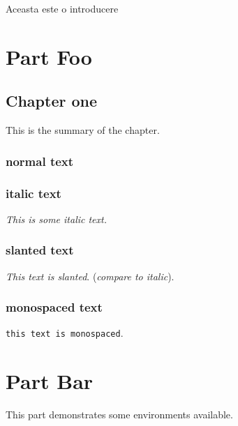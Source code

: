 \documentclass[a4paper,11pt,oneside]{yapbook}
\begin{document}
\frontmatter

\begin{abstract}

\lipsum

\end{abstract}

\tableofcontents


Aceasta este o introducere

\mainmatter

\part{Part Foo}

\chapter{Chapter one}

\begin{chapsummary}
This is the summary
of the chapter.

\lipsum[1]

\end{chapsummary}

\lipsum[1]

\section{normal text}

\section{italic text}
\textit{This is some italic text.}

\section{slanted text}
\textsl{This text is slanted}. (\textit{compare to italic}).

\section{monospaced text}
\texttt{this text is monospaced}.

\part{Part Bar}
This part demonstrates some environments available.

\backmatter



%
%
\end{document}
